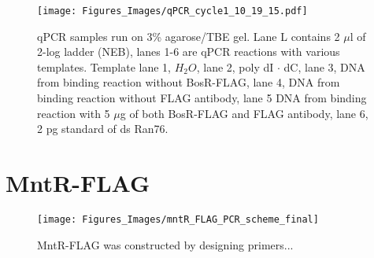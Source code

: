 \documentclass[12pt,twoside]{reedthesis}
\begin{document}
    
    
    \begin{figure}[h!tbp]
    	\centering
    	\texttt{[image: Figures\_Images/qPCR\_cycle1\_10\_19\_15.pdf]}
    	\caption[qPCR of 1st Cycle of CASTing Gel Analysis]{qPCR samples run on 3\% agarose/TBE gel. Lane L contains 2 $\mu$l of 2-log ladder (NEB), lanes 1-6 are qPCR reactions with various templates. Template lane 1, $H_{2}O$, lane 2, poly dI $\cdot$ dC, lane 3, DNA from binding reaction without BosR-FLAG, lane 4, DNA from binding reaction without FLAG antibody, lane 5 DNA from binding reaction with 5 $\mu$g of both BosR-FLAG and FLAG antibody, lane 6, 2 pg standard of ds Ran76.}
    	\label{qPCRcycle1}
    \end{figure}
    
    
    
    \clearpage

  \section{MntR-FLAG}
  
    	\begin{figure}[h]
    		
    		\centering
    		\texttt{[image: Figures\_Images/mntR\_FLAG\_PCR\_scheme\_final]}
    		\caption[MntR-FLAG PCR Scheme]{MntR-FLAG was constructed by designing primers...}
    		\label{MntRFLAG_Scheme}
    	\end{figure}
    	
    	
  

   
    	

  
\end{document}
